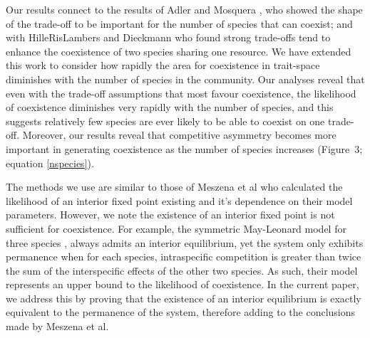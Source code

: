 Our results connect  to the results of Adler and Mosquera \cite{adler2000space}, who showed the shape of the trade-off to be important for the number of species that can coexist; and with HilleRisLambers and Dieckmann \cite{hillerislambers2003competition} who found strong trade-offs tend to enhance the coexistence of two species sharing one resource. We have extended this work to consider how rapidly the area for coexistence in trait-space diminishes with the number of species in the community. Our analyses reveal that even with the trade-off assumptions that most favour coexistence, the likelihood of coexistence diminishes very rapidly with the number of species, and this suggests relatively few species are ever likely to be able to coexist on one trade-off. Moreover, our results reveal that competitive asymmetry becomes more important in generating coexistence as the number of species increases (Figure~3; equation \eqref{nspecies}).

The methods we use are similar to those of Meszena et al \cite{meszena2006competitive} who calculated the likelihood of an interior fixed point existing and it's dependence on their model parameters. However, we note the existence of an interior fixed point is not sufficient for coexistence. For example, the symmetric May-Leonard model for three species \cite{may1975nonlinear}, always admits an interior equilibrium, yet the system only exhibits permanence when for each species, intraspecific competition is greater than twice the sum of the interspecific effects of the other two species. As such, their model represents an upper bound to the likelihood of coexistence. In the current paper, we address this by proving that the existence of an interior equilibrium is exactly equivalent to the permanence of the system, therefore adding to the conclusions made by Meszena et al.

